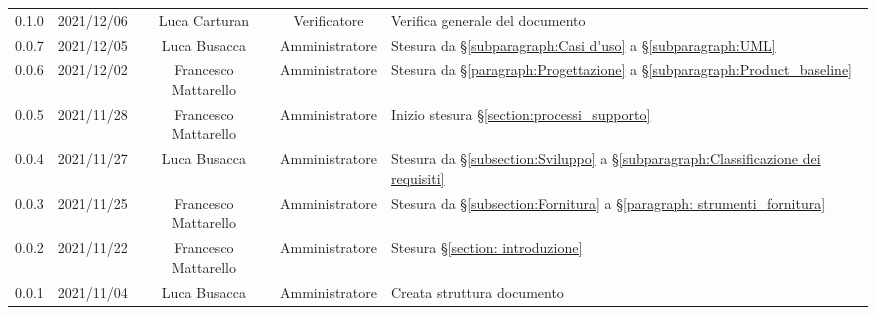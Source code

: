 \begin{center}
\begin{longtable}[c]{c | c | c | c | p{5cm}}
		0.1.0 & 2021/12/06 & Luca Carturan 				& Verificatore   & Verifica generale del documento \\
		0.0.7 & 2021/12/05 & Luca Busacca         & Amministratore & Stesura da  §\ref{subparagraph:Casi d'uso} a §\ref{subparagraph:UML} \\
		0.0.6 & 2021/12/02 & Francesco Mattarello & Amministratore & Stesura da  §\ref{paragraph:Progettazione} a §\ref{subparagraph:Product_baseline} \\
		0.0.5 & 2021/11/28 & Francesco Mattarello & Amministratore & Inizio stesura §\ref{section:processi_supporto}\\
		0.0.4 & 2021/11/27 & Luca Busacca         & Amministratore & Stesura da §\ref{subsection:Sviluppo} a  §\ref{subparagraph:Classificazione dei requisiti} \\
		0.0.3 & 2021/11/25 & Francesco Mattarello & Amministratore & Stesura da §\ref{subsection:Fornitura} a §\ref{paragraph: strumenti_fornitura} \\
		0.0.2 & 2021/11/22 & Francesco Mattarello & Amministratore & Stesura §\ref{section: introduzione} \\
		0.0.1 & 2021/11/04 & Luca Busacca         & Amministratore & Creata struttura documento \\
	\end{longtable}
\end{center}
